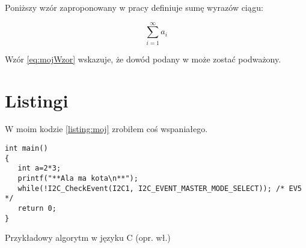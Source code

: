 Poniższy wzór zaproponowany w pracy \cite{aizawa_groundwater_2009} definiuje sumę wyrazów ciągu:

\begin{equation}
\sum_{i=1}^{\infty}a_i
\label{eq:mojWzor}
\end{equation}

Wzór \ref{eq:mojWzor} wskazuje, że dowód podany w \cite{kaleta_experimental_2005} może zostać podważony. \lipsum[1]


\section{Listingi}

W moim kodzie \ref{listing:moj} zrobiłem coś wspaniałego. \lipsum[2]

\begin{listing}
\begin{verbatim}
int main()
{
   int a=2*3;
   printf("**Ala ma kota\n**");
   while(!I2C_CheckEvent(I2C1, I2C_EVENT_MASTER_MODE_SELECT)); /* EV5 */
   return 0;
}
\end{verbatim}
\caption{Przykładowy algorytm w języku C (opr. wł.)} \label{listing:moj}
\end{listing}

